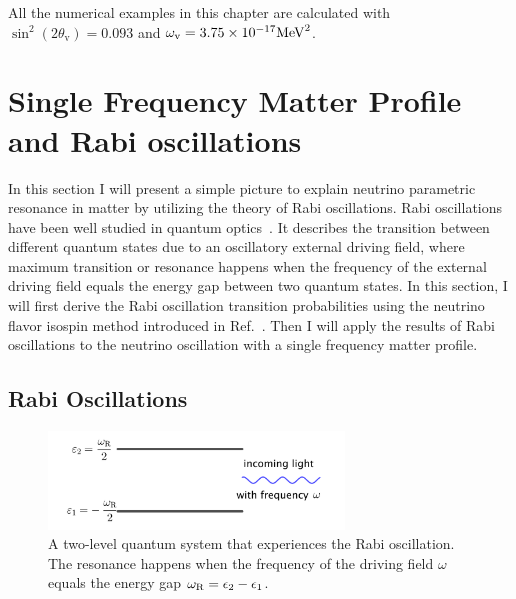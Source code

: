 All the numerical examples in this chapter are calculated with $\sin^2(2\theta_{\mathrm v}) = 0.093$ and $\omega_{\mathrm v} = 3.75\times 10^{-17}\mathrm{MeV}^2$.






\section{\label{chap:matter-sec:single}Single Frequency Matter Profile and Rabi oscillations}%


In this section I will present a simple picture to explain neutrino parametric resonance in matter by utilizing the theory of Rabi oscillations. Rabi oscillations have been well studied in quantum optics~\cite{Boyd2008}. It describes the transition between different quantum states due to an oscillatory external driving field, where maximum transition or resonance happens when the frequency of the external driving field equals the energy gap between two quantum states. In this section, I will first derive the Rabi oscillation transition probabilities using the neutrino flavor isospin method introduced in Ref.~\cite{Duan2006a}. Then I will apply the results of Rabi oscillations to the neutrino oscillation with a single frequency matter profile.


\subsection{\label{chap:app-sec:rabi-oscillations}Rabi Oscillations}

\begin{figure}[htbp]
    \centering
    \includegraphics[width=0.7\textwidth]{chapters/assets/matter/rabi-illustrative-diagram}
    \caption{A two-level quantum system that experiences the Rabi oscillation. The resonance happens when the frequency of the driving field $\omega$ equals the energy gap $\omega_\mathrm R = \epsilon_2 - \epsilon_1$.}
    \label{chap:app-sec:rabi-oscillations-fig:rabi-diagram}
\end{figure}

